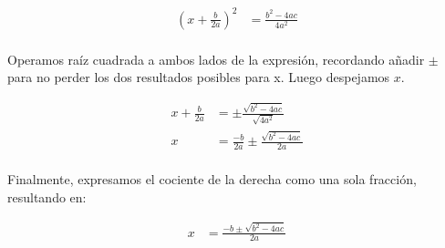 \begin{align*}
	\left(x + \frac{b}{2a}\right)^2 &= \frac{b^2 - 4ac}{4a^2}\\
\end{align*}

Operamos raíz cuadrada a ambos lados de la expresión, recordando añadir $\pm$ para no perder los dos resultados posibles para x. Luego despejamos $x$.

\begin{align*}
	x + \frac{b}{2a} &= \pm \frac{\sqrt{b^2 - 4ac}}{\sqrt{4a^2}}\\
	x &= \frac{-b}{2a} \pm \frac{\sqrt{b^2 - 4ac}}{2a}\\
\end{align*}

Finalmente, expresamos el cociente de la derecha como una sola fracción, resultando en:

\begin{align*}
	x &= \frac{-b \pm \sqrt{b^2 - 4ac}}{2a}\\
\end{align*}
